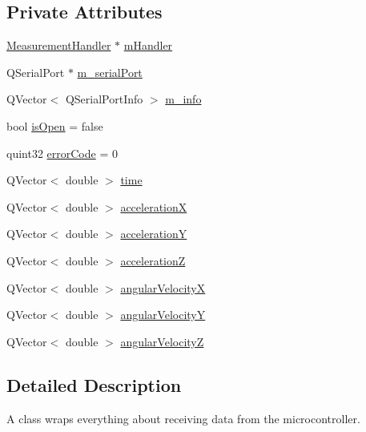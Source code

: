 \subsection*{Private Attributes}
\begin{DoxyCompactItemize}
\item 
\mbox{\hyperlink{class_measurement_handler}{Measurement\+Handler}} $\ast$ \mbox{\hyperlink{class_serial_port_reader_a2ee8eead177a8d309115708a4ca354d0}{m\+Handler}}
\item 
Q\+Serial\+Port $\ast$ \mbox{\hyperlink{class_serial_port_reader_a07a8c1715274118e7886f671f287c3ec}{m\+\_\+serial\+Port}}
\item 
Q\+Vector$<$ Q\+Serial\+Port\+Info $>$ \mbox{\hyperlink{class_serial_port_reader_a2c2207d575acd7adc3746e514a00e819}{m\+\_\+info}}
\item 
bool \mbox{\hyperlink{class_serial_port_reader_a944ec89d2b0aa1a27e873c77cfbaf355}{is\+Open}} = false
\item 
quint32 \mbox{\hyperlink{class_serial_port_reader_a40153d2e5ce2b54838b9ba25c2316340}{error\+Code}} = 0
\item 
Q\+Vector$<$ double $>$ \mbox{\hyperlink{class_serial_port_reader_ac023d7fa3c67e9e9d3d20e73249312c5}{time}}
\item 
Q\+Vector$<$ double $>$ \mbox{\hyperlink{class_serial_port_reader_a2224bf8c59a93b8a5ef77eace260c34c}{accelerationX}}
\item 
Q\+Vector$<$ double $>$ \mbox{\hyperlink{class_serial_port_reader_a86769450ee3907fe92dc9714f7982f26}{accelerationY}}
\item 
Q\+Vector$<$ double $>$ \mbox{\hyperlink{class_serial_port_reader_aa500a86c782f296ca529f0f4d5145366}{accelerationZ}}
\item 
Q\+Vector$<$ double $>$ \mbox{\hyperlink{class_serial_port_reader_aeab041942a6e6178814f08315a5d73ea}{angular\+VelocityX}}
\item 
Q\+Vector$<$ double $>$ \mbox{\hyperlink{class_serial_port_reader_a5c33041effc3f958c039aceb5741c7f0}{angular\+VelocityY}}
\item 
Q\+Vector$<$ double $>$ \mbox{\hyperlink{class_serial_port_reader_a906e4e7d144d9a105fc8d4f31fcf40e9}{angular\+VelocityZ}}
\end{DoxyCompactItemize}


\subsection{Detailed Description}
A class wraps everything about receiving data from the microcontroller. 


